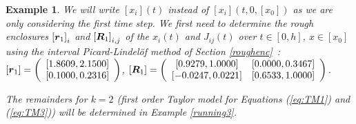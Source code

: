 \documentclass{sig-alternate-05-2015} %
\newcommand\ForAuthors[1]%
 {\par\smallskip                     %
  \begin{center}%
   \fbox%
   {\parbox{0.9\linewidth}%
    {\raggedright\sc--- #1}%
   }%
  \end{center}%
  \par\smallskip                     %
 }
\newtheorem{example}{Example}
\def\intvl#1{\mbox{$[ #1 ]$}}
\begin{document}
\begin{example}
We will write $\intvl{x_i}(t)$ instead of $\intvl{x_i}(t,0,\intvl{x_0})$ as
we are only considering the first time step. 
We first need to determine the rough enclosures
$\intvl{\r_1}_i$ and $\intvl{\bfm{R}_1}_{i,j}$ of the $x_i(t)$ and $J_{ij}(t)$ over $t\in [0,h]$, 
$x \in \intvl{x_0}$ %
using the interval Picard-Lindel\"of method of Section \ref{roughenc}~: 
$\intvl{\r_1} = \left(\begin{array}{c}
\left[ 1.8609,    2.1500 \right]\\ 
\left[ 0.1000,    0.2316 \right] 
\end{array}\right)$, 
$\intvl{\bfm{R}_1} =\left(\begin{array}{cc} 
\left[    0.9279,    1.0000\right] & \left[    0.0000,    0.3467\right] \\
\left[   -0.0247,    0.0221\right] & \left[    0.6533,    1.0000\right] 
\end{array}\right)$. 

The remainders
for $k=2$ (first order Taylor model for Equations (\ref{eq:TM1}) and (\ref{eq:TM3}))
will be determined in Example \ref{running3}. 
\end{example}
\end{document}
